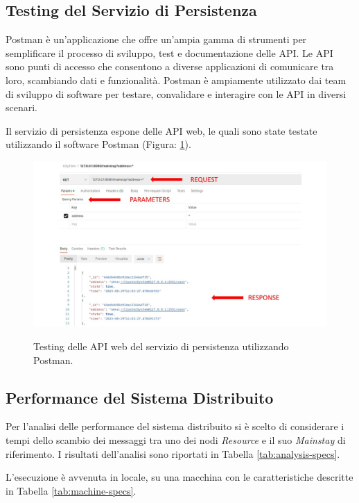 \documentclass{scrartcl}
\begin{document}
\subsection{Testing del Servizio di Persistenza}

Postman\cite{postman} è un'applicazione che offre un'ampia gamma di strumenti per semplificare il processo di sviluppo, test e documentazione delle API. Le API sono punti di accesso che consentono a diverse applicazioni di comunicare tra loro, scambiando dati e funzionalità. Postman è ampiamente utilizzato dai team di sviluppo di software per testare, convalidare e interagire con le API in diversi scenari.

Il servizio di persistenza espone delle API web, le quali sono state testate utilizzando il software Postman (Figura: \ref{fig:postman}).

\begin{figure}[H]
    \caption{Testing delle API web del servizio di persistenza utilizzando Postman.}
    \includegraphics[width=\textwidth]{../assets/images/postman.jpg}
    \label{fig:postman}
\end{figure}

\subsection{Performance del Sistema Distribuito}

Per l'analisi delle performance del sistema distribuito si è scelto di considerare i tempi dello scambio dei messaggi tra uno dei nodi \textit{Resource} e il suo \textit{Mainstay} di riferimento. I risultati dell'analisi sono riportati in Tabella \ref{tab:analysis-specs}.

L'esecuzione è avvenuta in locale, su una macchina con le caratteristiche descritte in Tabella \ref{tab:machine-specs}.
\end{document}

